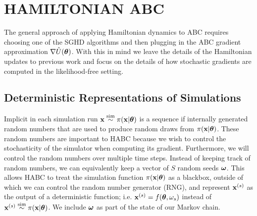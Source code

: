 \documentclass[]{article}
\begin{document}
\section{HAMILTONIAN ABC}\label{sec:habc}
The general approach of applying Hamiltonian dynamics to ABC requires choosing one of the SGHD algorithms and then plugging in the ABC gradient approximation $\nabla \hat{U}({\bm \theta})$.  With this in mind we leave the details of the Hamiltonian updates to previous work \cite{welling2011bayesian,chen2014stochastic,ding2014bayesian} and focus on the details of how stochastic gradients are computed in the likelihood-free setting.

\subsection{Deterministic Representations of Simulations}
Implicit in each simulation run ${\bf x} \overset{\operatorname{sim}}{\sim} \pi({\bf x} | {\bm \theta})$ is a sequence if internally generated random numbers that are used to produce random draws from $\pi({\bf x} | {\bm \theta})$.  These random numbers are important to HABC because we wish to control the stochasticity of the simulator when computing its gradient.  Furthermore, we will control the random numbers over multiple time steps.  Instead of keeping track of random numbers, we can equivalently keep a vector of $S$ random seeds ${\bm \omega}$.  This allows HABC to treat the simulation function $\pi({\bf x}|{\bm \theta})$ as a blackbox, outside of which we can control the random number generator (RNG), and represent ${\bf x}^{(s)}$ as the output of a deterministic function; i.e.  ${\bf x}^{(s)} = f( {\bm \theta}, \omega_s)$ instead of ${\bf x}^{(s)} \overset{\operatorname{sim}}{\sim} \pi({\bf x} | {\bm \theta})$.   We include ${\bm \omega}$ as part of the state of our Markov chain.
\end{document}
